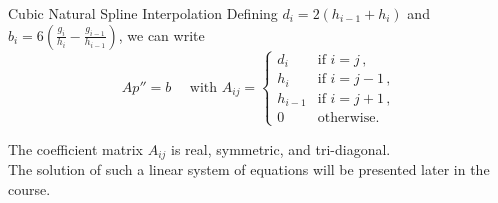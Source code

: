 \documentclass[11pt]{beamer}
\begin{document}
\begin{frame}[fragile]{Cubic Natural Spline Interpolation}
Defining $d_i = 2(h_{i-1} + h_i)$ and $b_i = 6\left(\frac{g_i}{h_i} 
- \frac{g_{i-1}}{h_{i-1}}\right)$, we can write 
\begin{equation}
A p'' = b \hspace{1em}\text{ with } A_{ij} = \left\{ \begin{array}{ll}
d_i &\text{if } i=j\,,\\
h_i &\text{if } i=j-1\,,\\
h_{i-1}&\text{if } i=j+1\,,\\
0&\text{otherwise}.
\end{array}\right.
\end{equation}
\pause

The coefficient matrix $A_{ij}$ is real, symmetric, and tri-diagonal.\\
The solution of such a linear system of equations will be presented later in the course.
\end{frame}
\end{document}
